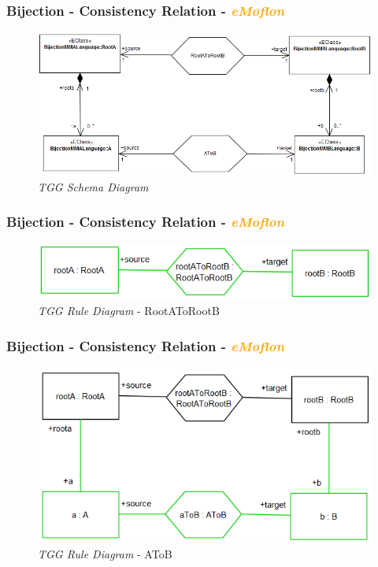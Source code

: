 \documentclass{beamer}
\begin{document}
\begin{frame}
\frametitle{Bijection - \textbf{Consistency Relation} - \textbf{\textit{\textcolor{orange}{eMoflon}}}}

\begin{figure}[ht]
  \centering 
  \includegraphics[scale=0.35]{printscreens/ea-MMAToMMB.png}
  \caption{\textit{TGG Schema Diagram}}
  \label{fig:ea-MMAToMMB}
\end{figure}

\end{frame}

\begin{frame}
\frametitle{Bijection - \textbf{Consistency Relation} - \textbf{\textit{\textcolor{orange}{eMoflon}}}}

\begin{figure}[ht]
  \centering 
  \includegraphics[scale=0.5]{printscreens/ea-RootAToRootB-rule.png}
  \caption{\textit{TGG Rule Diagram} - RootAToRootB}
  \label{fig:ea-RootAToRootB-rule}
\end{figure}

\end{frame}

\begin{frame}
\frametitle{Bijection - \textbf{Consistency Relation} - \textbf{\textit{\textcolor{orange}{eMoflon}}}}

\begin{figure}[ht]
  \centering 
  \includegraphics[scale=0.5]{printscreens/ea-AToB-rule.png}
  \caption{\textit{TGG Rule Diagram} - AToB}
  \label{fig:ea-AToB-rule}
\end{figure}

\end{frame}
\end{document}
